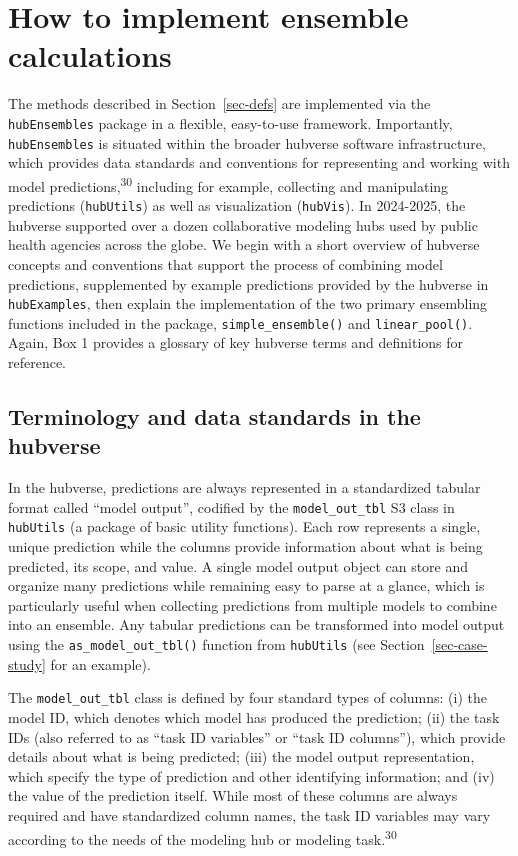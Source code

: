 \documentclass[
]{article}
\begin{document}
\section{How to implement ensemble
calculations}\label{sec-implementation}

The methods described in Section~\ref{sec-defs} are implemented via the
\texttt{hubEnsembles} package in a flexible, easy-to-use framework.
Importantly, \texttt{hubEnsembles} is situated within the broader
hubverse software infrastructure, which provides data standards and
conventions for representing and working with model
predictions,\textsuperscript{30} including for example, collecting and
manipulating predictions (\texttt{hubUtils}) as well as visualization
(\texttt{hubVis}). In 2024-2025, the hubverse supported over a dozen
collaborative modeling hubs used by public health agencies across the
globe. We begin with a short overview of hubverse concepts and
conventions that support the process of combining model predictions,
supplemented by example predictions provided by the hubverse in
\texttt{hubExamples}, then explain the implementation of the two primary
ensembling functions included in the package,
\texttt{simple\_ensemble()} and \texttt{linear\_pool()}. Again, Box 1
provides a glossary of key hubverse terms and definitions for reference.

\subsection{Terminology and data standards in the
hubverse}\label{terminology-and-data-standards-in-the-hubverse}

In the hubverse, predictions are always represented in a standardized
tabular format called ``model output'', codified by the
\texttt{model\_out\_tbl} S3 class in \texttt{hubUtils} (a package of
basic utility functions). Each row represents a single, unique
prediction while the columns provide information about what is being
predicted, its scope, and value. A single model output object can store
and organize many predictions while remaining easy to parse at a glance,
which is particularly useful when collecting predictions from multiple
models to combine into an ensemble. Any tabular predictions can be
transformed into model output using the \texttt{as\_model\_out\_tbl()}
function from \texttt{hubUtils} (see Section~\ref{sec-case-study} for an
example).

The \texttt{model\_out\_tbl} class is defined by four standard types of
columns: (i) the model ID, which denotes which model has produced the
prediction; (ii) the task IDs (also referred to as ``task ID variables''
or ``task ID columns''), which provide details about what is being
predicted; (iii) the model output representation, which specify the type
of prediction and other identifying information; and (iv) the value of
the prediction itself. While most of these columns are always required
and have standardized column names, the task ID variables may vary
according to the needs of the modeling hub or modeling
task.\textsuperscript{30}
\end{document}

